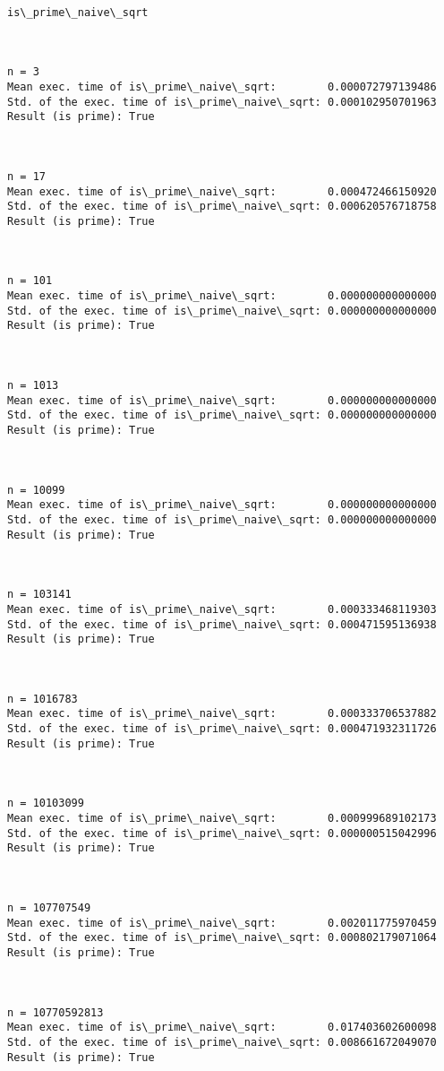 \documentclass[11pt]{article}
\begin{document}
    \begin{Verbatim}[commandchars=\\\{\}]




is\_prime\_naive\_sqrt



n = 3
Mean exec. time of is\_prime\_naive\_sqrt:        0.000072797139486
Std. of the exec. time of is\_prime\_naive\_sqrt: 0.000102950701963
Result (is prime): True



n = 17
Mean exec. time of is\_prime\_naive\_sqrt:        0.000472466150920
Std. of the exec. time of is\_prime\_naive\_sqrt: 0.000620576718758
Result (is prime): True



n = 101
Mean exec. time of is\_prime\_naive\_sqrt:        0.000000000000000
Std. of the exec. time of is\_prime\_naive\_sqrt: 0.000000000000000
Result (is prime): True



n = 1013
Mean exec. time of is\_prime\_naive\_sqrt:        0.000000000000000
Std. of the exec. time of is\_prime\_naive\_sqrt: 0.000000000000000
Result (is prime): True



n = 10099
Mean exec. time of is\_prime\_naive\_sqrt:        0.000000000000000
Std. of the exec. time of is\_prime\_naive\_sqrt: 0.000000000000000
Result (is prime): True



n = 103141
Mean exec. time of is\_prime\_naive\_sqrt:        0.000333468119303
Std. of the exec. time of is\_prime\_naive\_sqrt: 0.000471595136938
Result (is prime): True



n = 1016783
Mean exec. time of is\_prime\_naive\_sqrt:        0.000333706537882
Std. of the exec. time of is\_prime\_naive\_sqrt: 0.000471932311726
Result (is prime): True



n = 10103099
Mean exec. time of is\_prime\_naive\_sqrt:        0.000999689102173
Std. of the exec. time of is\_prime\_naive\_sqrt: 0.000000515042996
Result (is prime): True



n = 107707549
Mean exec. time of is\_prime\_naive\_sqrt:        0.002011775970459
Std. of the exec. time of is\_prime\_naive\_sqrt: 0.000802179071064
Result (is prime): True



n = 10770592813
Mean exec. time of is\_prime\_naive\_sqrt:        0.017403602600098
Std. of the exec. time of is\_prime\_naive\_sqrt: 0.008661672049070
Result (is prime): True




\end{Verbatim}
\end{document}
